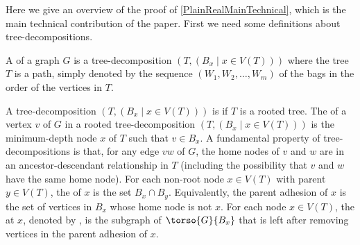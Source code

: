 

Here we give an overview of the proof of \cref{PlainRealMainTechnical}, which is the main technical contribution of the paper. First we need some definitions about tree-decompositions.

A  of a graph $G$ is a tree-decomposition $(T,(B_x \mid x\in V(T)))$ where the tree $T$ is a path, simply denoted by the sequence $(W_1, W_2, \dots, W_m)$ of the bags in the order of the vertices in $T$.

A tree-decomposition $(T,(B_x \mid x\in V(T)))$ is  if $T$ is a rooted tree.  The  of a vertex $v$ of $G$ in a rooted tree-decomposition $(T,(B_x \mid x\in V(T)))$ is the minimum-depth node $x$ of $T$ such that $v\in B_x$.
A fundamental property of tree-decompositions is that, for any edge $vw$ of $G$, the home nodes of $v$ and $w$ are in an ancestor-descendant relationship in $T$ (including the possibility that $v$ and $w$ have the same home node).
For each non-root node $x\in V(T)$ with parent $y\in V(T)$, the  of  $x$ is the set  $B_x \cap B_y$.
Equivalently, the parent adhesion of $x$ is the set of vertices in $B_x$ whose home node is not $x$. For each node $x\in V(T)$, the  at $x$, denoted by ,  is the subgraph of $\torso{G}{B_x}$ that is left after removing vertices in the parent adhesion of $x$.  

